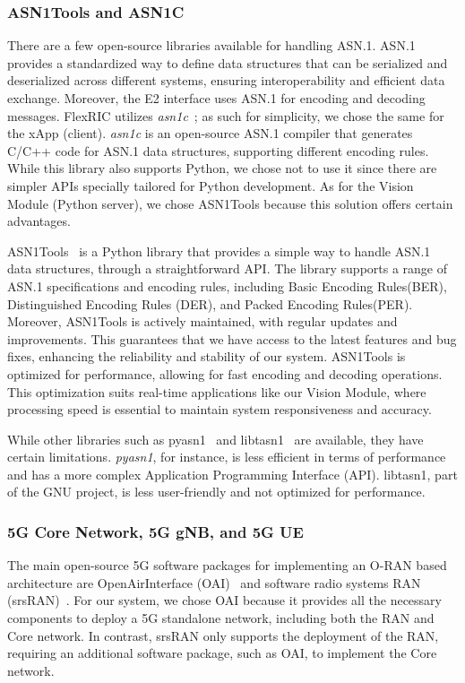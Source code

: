 \subsubsection{ASN1Tools and ASN1C}
There are a few open-source libraries available for handling ASN.1.
ASN.1 provides a standardized way to define data structures that can be serialized and deserialized across different systems, ensuring interoperability and efficient data exchange.
Moreover, the E2 interface uses ASN.1 for encoding and decoding messages.
FlexRIC utilizes \emph{asn1c}~\cite{asn1c}; as such for simplicity, we chose the same for the xApp (client).
\emph{asn1c} is an open-source ASN.1 compiler that generates C/C++ code for ASN.1 data structures, supporting different encoding rules.
While this library also supports Python, we chose not to use it since there are simpler APIs specially tailored for Python development.
As for the Vision Module (Python server), we chose ASN1Tools because this solution offers certain advantages.

ASN1Tools~\cite{asn1tools} is a Python library that provides a simple way to handle ASN.1 data structures, through a straightforward API\@.
The library supports a range of ASN.1 specifications and encoding rules, including Basic Encoding Rules(BER), Distinguished Encoding Rules (DER), and Packed Encoding Rules(PER)\@.
Moreover, ASN1Tools is actively maintained, with regular updates and improvements.
This guarantees that we have access to the latest features and bug fixes, enhancing the reliability and stability of our system.
ASN1Tools is optimized for performance, allowing for fast encoding and decoding operations.
This optimization suits real-time applications like our Vision Module, where processing speed is essential to maintain system responsiveness and accuracy.

While other libraries such as pyasn1~\cite{pyasn1} and libtasn1~\cite{libtasn1} are available, they have certain limitations.
\emph{pyasn1}, for instance, is less efficient in terms of performance and has a more complex Application Programming Interface (API)\@.
libtasn1, part of the GNU project, is less user-friendly and not optimized for performance.


\subsubsection{5G Core Network, 5G gNB, and 5G UE}
The main open-source 5G software packages for implementing an O-RAN based architecture are OpenAirInterface (OAI)~\cite{openairinterface} and software radio systems RAN (srsRAN)~\cite{srslte}.
For our system, we chose OAI because it provides all the necessary components to deploy a 5G standalone network, including both the RAN and Core network.
In contrast, srsRAN only supports the deployment of the RAN, requiring an additional software package, such as OAI, to implement the Core network.

